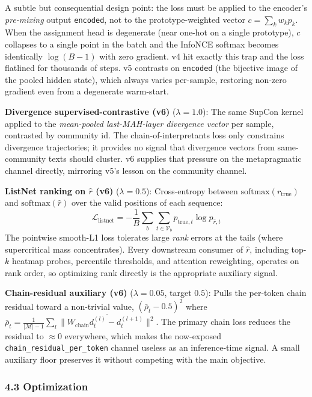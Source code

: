 \documentclass[
  11pt]{article}
\begin{document}
A subtle but consequential design point: the loss must be applied to the
encoder's \emph{pre-mixing} output \texttt{encoded}, not to the
prototype-weighted vector \(c = \sum_k w_k p_k\). When the assignment
head is degenerate (near one-hot on a single prototype), \(c\) collapses
to a single point in the batch and the InfoNCE softmax becomes
identically \(\log(B-1)\) with zero gradient. v4 hit exactly this trap
and the loss flatlined for thousands of steps. v5 contrasts on
\texttt{encoded} (the bijective image of the pooled hidden state), which
always varies per-sample, restoring non-zero gradient even from a
degenerate warm-start.

\textbf{Divergence supervised-contrastive (v6)} (\(\lambda = 1.0\)): The
same SupCon kernel applied to the \emph{mean-pooled last-MAH-layer
divergence vector} per sample, contrasted by community id. The
chain-of-interpretants loss only constrains divergence trajectories; it
provides no signal that divergence vectors from same-community texts
should cluster. v6 supplies that pressure on the metapragmatic channel
directly, mirroring v5's lesson on the community channel.

\textbf{ListNet ranking on \(\hat{r}\) (v6)} (\(\lambda = 0.5\)):
Cross-entropy between \(\text{softmax}(r_{\text{true}})\) and
\(\text{softmax}(\hat{r})\) over the valid positions of each sequence:
\[\mathcal{L}_{\text{listnet}} = -\frac{1}{B}\sum_b \sum_{t \in \mathcal{V}_b} p_{\text{true},t} \log p_{\hat{r},t}\]
The pointwise smooth-L1 loss tolerates large \emph{rank} errors at the
tails (where supercritical mass concentrates). Every downstream consumer
of \(\hat{r}\), including top-\(k\) heatmap probes, percentile
thresholds, and attention reweighting, operates on rank order, so
optimizing rank directly is the appropriate auxiliary signal.

\textbf{Chain-residual auxiliary (v6)} (\(\lambda = 0.05\), target
\(0.5\)): Pulls the per-token chain residual toward a non-trivial value,
\((\bar{\rho}_t - 0.5)^2\) where
\(\bar{\rho}_t = \frac{1}{|\mathcal{M}|-1}\sum_l \overline{\|W_{\text{chain}} d_t^{(l)} - d_t^{(l+1)}\|^2}\).
The primary chain loss reduces the residual to \(\approx 0\) everywhere,
which makes the now-exposed \texttt{chain\_residual\_per\_token} channel
useless as an inference-time signal. A small auxiliary floor preserves
it without competing with the main objective.

\subsubsection{4.3 Optimization}\label{optimization}
\end{document}
